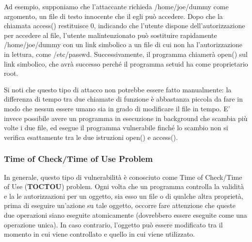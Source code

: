 Ad esempio, supponiamo che l'attaccante richieda /home/joe/dummy come argomento, un file di testo innocente che il egli può accedere. Dopo che la chiamata access() restituisce 0, indicando che l'utente dispone dell'autorizzazione per accedere al file, l'utente malintenzionato può sostituire rapidamente /home/joe/dummy con un link simbolico a un file di cui non ha l'autorizzazione in lettura, come /etc/passwd. Successivamente, il programma chiamerà open() sul link simbolico, che avrà successo perché il programma setuid ha come proprietario
root. \newline \newline

Si noti che questo tipo di attacco non potrebbe essere fatto manualmente: la differenza di tempo tra due chiamate di funzione è abbastanza piccola da fare in modo che nessun essere umano sia in grado di modificare il file in tempo. E’ invece possibile avere un programma in esecuzione in background che scambia più volte i due file, ed esegue il programma vulnerabile finché lo scambio non si verifica esattamente tra le due istruzioni open() e access(). \newline \newline

\subsubsection{Time of Check/Time of Use Problem}
In generale, questo tipo di vulnerabilità è conosciuto come Time of Check/Time of Use (\textbf{TOCTOU}) problem. Ogni volta che un programma controlla la validità e la le autorizzazioni per un oggetto, sia esso un file o di qualche altra proprietà, prima di eseguire un'azione su tale oggetto, occorre fare attenzione che queste due operazioni siano eseguite atomicamente (dovrebbero essere eseguite come una operazione unica). In caso contrario, l'oggetto può essere modificato tra il momento in cui viene controllato e quello in cui viene utilizzato. \newline \newline

